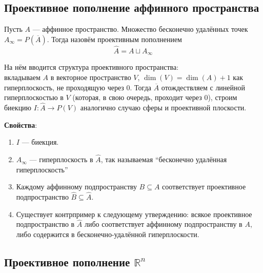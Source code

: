\documentclass[11pt]{article}
\begin{document}
    \subsection{Проективное пополнение аффинного пространства}

    \begin{definition}
        Пусть $A$ --- аффинное пространство. Множество бесконечно удалённых точек $A_{\infty} = P(\overline{A})$. Тогда назовём проективным пополнением
        \begin{equation*}
            \hat{A} = A \sqcup A_{\infty}
        \end{equation*}
    \end{definition}

    На нём вводится структура проективного пространства: \\
    вкладываем $A$ в векторное пространство  $V$, $\dim(V) = \dim(A) + 1$ как гиперплоскость, не проходящую через $0$. Тогда $\overline{A}$ отождествляем с линейной гиперплоскостью в $V$ (которая, в свою очередь, проходит через $0$), строим биекцию $I: \hat{A} \to P(V)$ аналогично случаю сферы и проективной плоскости.

    \textbf{Свойства}:
    \begin{enumerate}
        \item $I$ --- биекция.
        \item $A_{\infty}$ --- гиперплоскость в $\hat{A}$, так называемая ``бесконечно удалённая гиперплоскость''
        \item Каждому аффинному подпространству $B \subseteq A$ соответствует проективное подпространство $\hat{B} \subseteq \hat{A}$.
        \item Существует контрпример к следующему утверждению: всякое проективное подпространство в $\hat{A}$ либо соответствует аффинному подпространству в $A$, либо содержится в бесконечно-удалённой гиперплоскости.
    \end{enumerate}
    \subsection{Проективное пополнение $\mathbb{R}^n$}
\end{document}

